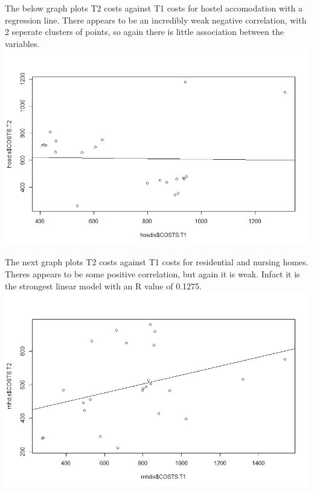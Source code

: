 \documentclass[]{article}
\begin{document}
The below graph plots T2 costs against T1 costs for hostel accomodation with a regression line. There appears to be an incredibly weak negative correlation, with 2 seperate clusters of points, so again there is little association between the variables.
\centering
\includegraphics[width=\textwidth]{RStudio/jpeg/Reg_HOS.jpeg}
\raggedright

The next graph plots T2 costs against T1 costs for residential and nursing homes. Theres appears to be some positive correlation, but again it is weak. Infact it is the strongest linear model with an R value of 0.1275.
\centering
\includegraphics[width=\textwidth]{RStudio/jpeg/Reg_RNH.jpeg}
\raggedright
\end{document}
